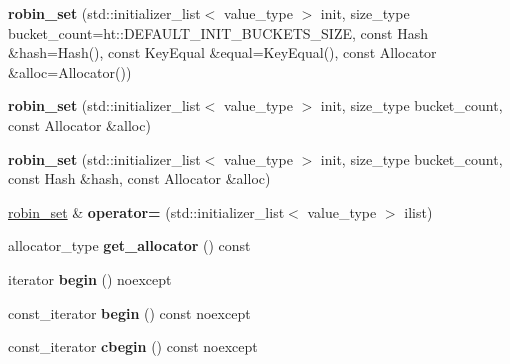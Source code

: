 \begin{DoxyCompactItemize}
\item 
\mbox{\label{classtsl_1_1robin__set_ab296424a8ac50583c5b6121d39e51c44}} 
{\bfseries robin\+\_\+set} (std\+::initializer\+\_\+list$<$ value\+\_\+type $>$ init, size\+\_\+type bucket\+\_\+count=ht\+::\+D\+E\+F\+A\+U\+L\+T\+\_\+\+I\+N\+I\+T\+\_\+\+B\+U\+C\+K\+E\+T\+S\+\_\+\+S\+I\+ZE, const Hash \&hash=Hash(), const Key\+Equal \&equal=Key\+Equal(), const Allocator \&alloc=Allocator())
\item 
\mbox{\label{classtsl_1_1robin__set_a27ddaae9e5764f679d41c298f95e9c5a}} 
{\bfseries robin\+\_\+set} (std\+::initializer\+\_\+list$<$ value\+\_\+type $>$ init, size\+\_\+type bucket\+\_\+count, const Allocator \&alloc)
\item 
\mbox{\label{classtsl_1_1robin__set_aece3c79d29353620376c0cb7dca59d4a}} 
{\bfseries robin\+\_\+set} (std\+::initializer\+\_\+list$<$ value\+\_\+type $>$ init, size\+\_\+type bucket\+\_\+count, const Hash \&hash, const Allocator \&alloc)
\item 
\mbox{\label{classtsl_1_1robin__set_ae312ab98399e06c3340f40bd78fdd0b5}} 
\mbox{\hyperlink{classtsl_1_1robin__set}{robin\+\_\+set}} \& {\bfseries operator=} (std\+::initializer\+\_\+list$<$ value\+\_\+type $>$ ilist)
\item 
\mbox{\label{classtsl_1_1robin__set_aaf6d53ce36f50c1d755afd82e37e6e17}} 
allocator\+\_\+type {\bfseries get\+\_\+allocator} () const
\item 
\mbox{\label{classtsl_1_1robin__set_a4df323d6a0af575a9921bafbb18cc538}} 
iterator {\bfseries begin} () noexcept
\item 
\mbox{\label{classtsl_1_1robin__set_aa8d15bd185f748c2e2cb6a78202f8601}} 
const\+\_\+iterator {\bfseries begin} () const noexcept
\item 
\mbox{\label{classtsl_1_1robin__set_a357c4e870ef1d02f91b838d6c4f94561}} 
const\+\_\+iterator {\bfseries cbegin} () const noexcept
\item 
\mbox{\label{classtsl_1_1robin__set_a84a8a821344c1043c183d7fa91b9aefa}} 

\end{DoxyCompactItemize}
